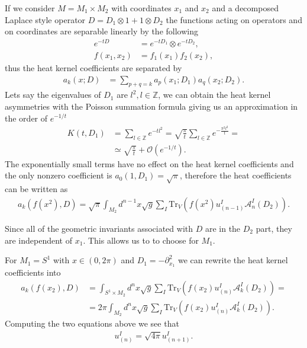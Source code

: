 If we consider $M = M_1 \times M_2$ with coordinates $x_1$ and $x_2$ and a
decomposed Laplace style operator $D = D_1 \otimes 1 + 1 \otimes D_2$ the
functions acting on operators and on coordinates are separable linearly by the
following
\begin{align}
    e^{-tD} &= e^{-tD_1} \otimes e^{-tD_2},\\
    f(x_1, x_2) &= f_1(x_1)f_2(x_2),
\end{align}
thus the heat kernel coefficients are separated by
\begin{align}
    a_k(x;D) &= \sum_{p+q=k} a_p(x_1; D_1)a_q(x_2;D_2).
\end{align}
Lets say the eigenvalues of $D_1$ are $l^2, l\in \mathbb{Z}$, we
can obtain the heat kernel asymmetries with the Poisson summation formula
giving us an approximation in the order of $e^{-1/t}$
\begin{align}
    K(t, D_1) &= \sum_{l\in\mathbb{Z}} e^{-tl^2} = \sqrt{\frac{\pi}{t}}
    \sum_{l\in\mathbb{Z}} e^{-\frac{\pi^2l^2}{t}} = \nonumber \\
    &\simeq \sqrt{\frac{\pi}{t}} + \mathcal{O}(e^{-1/t}).
\end{align}
The exponentially small terms have no effect on the heat kernel
coefficients and the only nonzero coefficient is $a_0(1, D_1) =
\sqrt{\pi}$, therefore the heat coefficients can be written as
\begin{align}
    a_k(f(x^2), D) = \sqrt{\pi}\int_{M_2}
    d^{n-1}x\sqrt{g}\sum_I\text{Tr}_V\left(f(x^2)u^I_{(n-1)}
    \mathcal{A}^I_n(D_2)\right).
\end{align}

Since all of the geometric invariants  associated with $D$ are in the $D_2$
part, they are independent of $x_1$. This allows us to to choose for
$M_1$.

For $M_1 = S^1$ with $x\in (0, 2\pi)$ and $D_1=-\partial_{x_1}^2$
we can rewrite the heat kernel coefficients into
\begin{align}
    a_k(f(x_2), D) &= \int_{S^1\times M_2}d^nx \sqrt{g} \sum_I
    \text{Tr}_V(f(x_2) u_{(n)}^I \mathcal{A}^I_k(D_2))= \nonumber\\
    &= 2\pi \int_{M_2} d^nx\sqrt{g} \sum_I\text{Tr}_V(f(x_2) u_{(n)}^I
    \mathcal{A}^I_k(D_2)).
\end{align}
Computing the two equations above we see that
\begin{align}
    u_{(n)}^I = \sqrt{4\pi} u^I_{(n+1)}.
\end{align}

